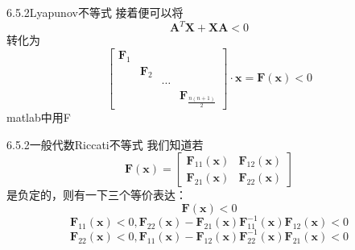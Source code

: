 \documentclass[10pt]{beamer}
\begin{document}
  \begin{frame}[allowframebreaks]{6.5.2Lyapunov不等式}
  接着便可以将\[\boldsymbol{A}^{T}\boldsymbol{X}+\boldsymbol{X}\boldsymbol{A}< 0\]
  转化为\[\begin{bmatrix}
  \boldsymbol{F}_{1} &  &  & \\ 
  & \boldsymbol{F}_{2} &  & \\ 
  &  & \cdots  & \\ 
  &  &  & \boldsymbol{F}_{\frac{n\left ( n+1\right )}{2}}
  \end{bmatrix}\cdot \boldsymbol{x}=\boldsymbol{F}\left ( \boldsymbol{x}\right )< 0 \]
  matlab中用F
  \end{frame}
  
  \begin{frame}[allowframebreaks]{6.5.2一般代数Riccati不等式}
  我们知道若\[\boldsymbol{F}\left ( \boldsymbol{x}\right )=\begin{bmatrix}
  \boldsymbol{F}_{11}\left ( \boldsymbol{x}\right ) & \boldsymbol{F}_{12}\left ( \boldsymbol{x}\right )\\ 
  \boldsymbol{F}_{21}\left ( \boldsymbol{x}\right ) & \boldsymbol{F}_{22}\left ( \boldsymbol{x}\right )
  \end{bmatrix}\]是负定的，则有一下三个等价表达：
  \[\boldsymbol{F}\left ( \boldsymbol{x}\right )< 0\]\[\boldsymbol{F}_{11}\left ( \boldsymbol{x}\right )< 0,\boldsymbol{F}_{22}\left ( \boldsymbol{x}\right )-\boldsymbol{F}_{21}\left ( \boldsymbol{x}\right )\boldsymbol{F}_{11}^{-1}\left ( \boldsymbol{x}\right )\boldsymbol{F}_{12}\left ( \boldsymbol{x}\right )< 0\]\[\boldsymbol{F}_{22}\left ( \boldsymbol{x}\right )< 0,\boldsymbol{F}_{11}\left ( \boldsymbol{x}\right )-\boldsymbol{F}_{12}\left ( \boldsymbol{x}\right )\boldsymbol{F}_{22}^{-1}\left ( \boldsymbol{x}\right )\boldsymbol{F}_{21}\left ( \boldsymbol{x}\right )< 0\]
  \end{frame}
  
\end{document}

